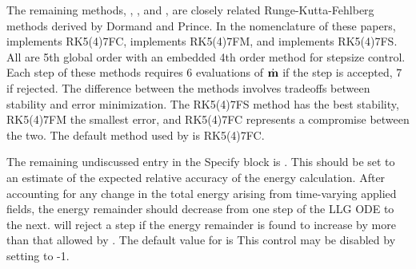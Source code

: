 \begin{description}
The remaining methods, ,  ,
and , are closely related Runge-Kutta-Fehlberg methods
derived by Dormand and Prince\cite{dormand1980,dormand1986}.  In the
nomenclature of these papers,
 implements RK5(4)7FC,
 implements RK5(4)7FM, and
 implements RK5(4)7FS.
All are 5th global order with an embedded 4th order method for stepsize
control.  Each step of these methods requires 6 evaluations of
$\dot{\textbf{m}}$ if the step is accepted, 7 if rejected.  The difference
between the methods involves tradeoffs between stability and error
minimization.  The RK5(4)7FS method has the best stability, RK5(4)7FM
the smallest error, and RK5(4)7FC represents a compromise between the
two.  The default method used by  is
RK5(4)7FC.

\label{HTMLoxsrkeprecision}
The remaining undiscussed entry in the 
Specify block is .  This should be set to an
estimate of the expected relative accuracy of the energy calculation.
After accounting for any change in the total energy arising from
time-varying applied fields, the energy remainder should decrease from
one step of the LLG ODE to the next.   will
reject a step if the energy remainder is found to increase by more than
that allowed by .  The default value for
 is   This control
may be disabled by setting  to -1.


\end{description}
